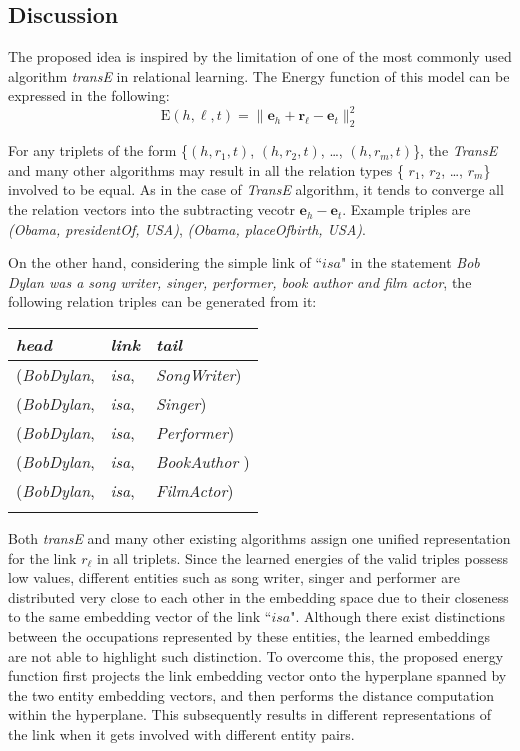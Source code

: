 \documentclass[9pt]{sig-alternate-05-2015}
\begin{document}
\subsection{Discussion}
The proposed idea is inspired by the limitation of one of the most commonly used algorithm \emph{transE} \cite{bordes_translating_2013}  in relational learning. The Energy function of this model can be expressed in the following:
\begin{equation}
\mathrm{E}{(h,\ell, t)} = \|\bm{e}_h + \bm{r}_{\ell}-\bm{e}_t\|_2^2
\end{equation}

For any triplets of the form \{$(h, r_1, t)$, $(h, r_2, t)$, \ldots, $(h, r_m, t)$\}, the \emph{TransE}  and many other algorithms may result in all the relation types  \{ $r_1$, $r_2$, \ldots, $r_m$\} involved to be equal. As in the case of \emph{TransE} algorithm, it tends to converge all the relation vectors into the subtracting vecotr  $\bm{e}_h - \bm{e}_t$.  Example triples are \emph{(Obama, presidentOf, USA)}, \emph{(Obama, placeOfbirth, USA)}.

 On the other hand, considering the simple link of ``$isa$" in  the statement \emph{Bob Dylan was a song writer, singer, performer, book author and film actor}, the following relation triples can be generated from it:
\\
\begin{tabular}[center]{l l l} 
 \\
 \emph{head} & \emph{link} & \emph{tail} \\
 \hline 
 (\emph{BobDylan}, & \emph{isa}, & \emph{SongWriter}) \\
 (\emph{BobDylan}, & \emph{isa}, & \emph{Singer}) \\
  (\emph{BobDylan}, & \emph{isa}, & \emph{Performer}) \\
   (\emph{BobDylan}, & \emph{isa}, & \emph{BookAuthor }) \\
    (\emph{BobDylan}, & \emph{isa}, & \emph{FilmActor}) \\\\
 \end{tabular}
 
Both \emph{transE} and many other existing algorithms assign one unified representation for the link $r_{\ell}$ in all triplets.  Since the learned energies of the valid triples  possess low values,  different entities such as song writer, singer and performer are  distributed very close to each other in the embedding space due to their closeness to the same embedding vector of  the link ``$isa$". Although there exist distinctions between the occupations represented by these entities, the learned embeddings are not able to highlight such distinction. To overcome this,  the proposed energy function  first projects the link embedding vector onto the hyperplane spanned by the two  entity embedding vectors, and then performs the distance computation within the hyperplane.  This subsequently results in different representations of the link when it gets involved with different entity pairs.  
\end{document}
